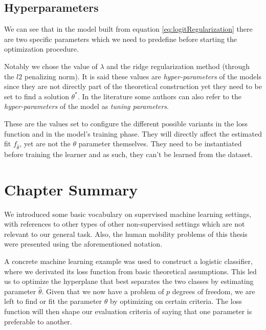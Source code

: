 \subsection{Hyperparameters}

We can see that in the model built from equation \cref{eq:logitRegularization} there are two specific parameters which we need to predefine before starting the optimization procedure.

Notably we chose the value of $\lambda$ and the ridge regularization method (through the $l2$ penalizing norm). %
It is said these values are \textit{hyper-parameters} of the models since they are not directly part of the theoretical construction yet they need to be set to find a solution $\theta^\ast$.
In the literature some authors can also refer to the \textit{hyper-parameters} of the model as \textit{tuning parameters}.

These are the values set to configure the different possible variants in the loss function and in the model's training phase.
They will directly affect the estimated fit $f_{\hat{\theta}}$, yet are not the $\theta$ parameter themselves.
They need to be instantiated before training the learner and as such, they can't be learned from the dataset.




\section{Chapter Summary}\label{section-ch_machine_learning_summary}

We introduced some basic vocabulary on supervised machine learning settings, with references to other types of other non-supervised settings which are not relevant to our general task.
Also, the human mobility problems of this thesis were presented using the aforementioned notation.

A concrete machine learning example was used to construct a logistic classifier, where we derivated its loss function from basic theoretical assumptions.
This led us to optimize the hyperplane that best separates the two classes by estimating parameter $\hat{\theta}$.
Given that we now have a problem of $p$ degrees of freedom, we are left to find or fit the parameter $\theta$ by optimizing on certain criteria.
The loss function will then shape our evaluation criteria of saying that one parameter is preferable to another.

